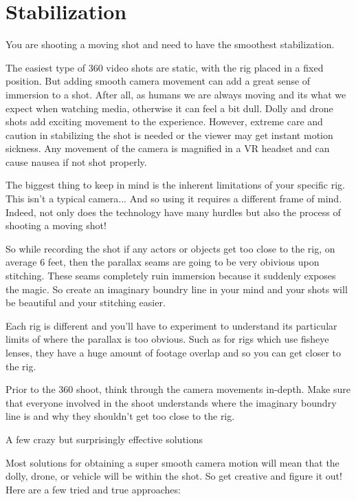 \chapter{Stabilization}
\pagecolor{white}
\label{chap:24}
\begin{fullwidth}


\problem

{\large You are shooting a moving shot and need to have the smoothest stabilization. \par}

The easiest type of 360 video shots are static, with the rig placed in a fixed position. But adding smooth camera movement can add a great sense of immersion to a shot. After all, as humans we are always moving and its what we expect when watching media, otherwise it can feel a bit dull. Dolly and drone shots add exciting movement to the experience. However, extreme care and caution in stabilizing the shot is needed or the viewer may get instant motion sickness. Any movement of the camera is magnified in a VR headset and can cause nausea if not shot properly.


\solution

The biggest thing to keep in mind is the inherent limitations of your specific rig. This isn't a typical camera... And so using it requires a different frame of mind. Indeed, not only does the technology have many hurdles but also the process of shooting a moving shot!

So while recording the shot if any actors or objects get too close to the rig, on average 6 feet, then the parallax seams are going to be very obivious upon stitching. These seams completely ruin immersion because it suddenly exposes the magic. So create an imaginary boundry line in your mind and your shots will be beautiful and your stitching easier.

Each rig is different and you’ll have to experiment to understand its particular limits of where the parallax is too obvious. Such as for rigs which use fisheye lenses, they have a huge amount of footage overlap and so you can get closer to the rig.

Prior to the 360 shoot, think through the camera movements in-depth. Make sure that everyone involved in the shoot understands where the imaginary boundry line is and why they shouldn't get too close to the rig.

{\large A few crazy but surprisingly effective solutions \par}
Most solutions for obtaining a super smooth camera motion will mean that the dolly, drone, or vehicle will be within the shot. So get creative and figure it out! Here are a few tried and true approaches:


\end{fullwidth}
